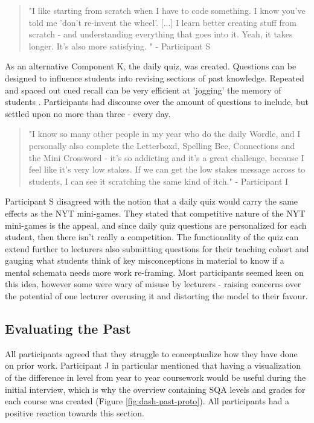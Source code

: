 \documentclass{l4proj}
\begin{document}
\begin{quote}
    "I like starting from scratch when I have to code something. I know you've told me 'don't re-invent the wheel'. [...] I learn better creating stuff from scratch - and understanding everything that goes into it. Yeah, it takes longer. It's also more satisfying. " - Participant S
\end{quote}

As an alternative Component K, the daily quiz, was created. Questions can be designed to influence students into revising sections of past knowledge. Repeated and spaced out cued recall can be very efficient at 'jogging' the memory of students \citep{cull2000untangling}. Participants had discourse over the amount of questions to include, but settled upon no more than three - every day. 

\begin{quote}
    "I know so many other people in my year who do the daily Wordle, and I personally also complete the Letterboxd, Spelling Bee, Connections and the Mini Crossword - it's so addicting and it's a great challenge, because I feel like it's very low stakes. If we can get the low stakes message across to students, I can see it scratching the same kind of itch." - Participant I
\end{quote}

Participant S disagreed with the notion that a daily quiz would carry the same effects as the NYT mini-games. They stated that competitive nature of the NYT mini-games is the appeal, and since daily quiz questions are personalized for each student, then there isn't really a competition. The functionality of the quiz can extend further to lecturers also submitting questions for their teaching cohort and gauging what students think of key misconceptions in material to know if a mental schemata needs more work re-framing. Most participants seemed keen on this idea, however some were wary of misuse by lecturers - raising concerns over the potential of one lecturer overusing it and distorting the model to their favour. 

\subsection{Evaluating the Past}

All participants agreed that they struggle to conceptualize how they have done on prior work. Participant J in particular mentioned that having a visualization of the difference in level from year to year coursework would be useful during the initial interview, which is why the overview containing SQA levels and grades for each course was created (Figure \ref{fig:dash-past-proto}). All participants had a positive reaction towards this section.
\end{document}
